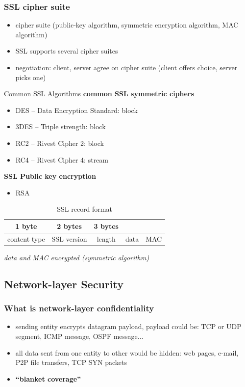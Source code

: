\subsubsection{SSL cipher suite}
\begin{itemize}
	\item cipher suite (public-key algorithm, symmetric encryption algorithm, MAC algorithm)
	\item SSL supports several cipher suites
	\item negotiation: client, server agree on cipher suite (client offers choice, server picks one)
\end{itemize}
\begin{note}{Common SSL Algorithms}
	\textbf{common SSL symmetric ciphers}
	\begin{itemize}
		\item DES -- Data Encryption Standard: block
		\item 3DES -- Triple strength: block
		\item RC2 -- Rivest Cipher 2: block
		\item RC4 -- Rivest Cipher 4: stream
	\end{itemize}
	\textbf{SSL Public key encryption}
	\begin{itemize}
		\item RSA
	\end{itemize}
\end{note}
\begin{table}[H]
	\centering
	\caption{SSL record format}
	\begin{tabular}{ccccc}
		1 byte & 2 bytes & 3 bytes &&\\
		\midrule
		content type & SSL version & length & data & MAC
	\end{tabular}
\end{table}
\textit{data and MAC encrypted (symmetric algorithm)}

\subsection{Network-layer Security}
\subsubsection{What is network-layer confidentiality}
\begin{itemize}
	\item sending entity encrypts datagram payload, payload could be: TCP or UDP segment, ICMP message, OSPF message...
	\item all data sent from one entity to other would be hidden: web pages, e-mail, P2P file transfers, TCP SYN packets
	\item \textbf{``blanket coverage''}
\end{itemize}
